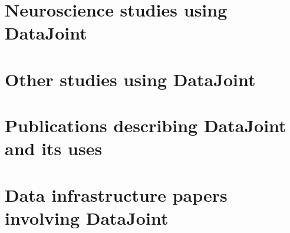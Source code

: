 \documentclass[letter,10pt]{article}
\begin{document}
\section*{Neuroscience studies using DataJoint}

\cite{vai-2013, cotton-2013, ecker-2014, reimer2014pupil, erisken-2014, 
froudarakis_population_2014, yatsenko2015a, jiang_principles_2015,
shan2016spatial, cadwell2016, baden2016functional,
reimer-2016, franke-2017, denfield2018attentional, 
sinz2018stimulus, roson2019mouse, walker2019inception, fahey2019global, cadena2019deep, heath2020circuit,
aguillon2020standardized, yap2020bidirectional}

\section*{Other studies using DataJoint}
\cite{hartmann2016alternative}

\section*{Publications describing DataJoint and its uses}
\cite{yatsenko-datajoint-2015, yatsenko-2018-datajoint, singer2019, reimer2020core}

\section*{Data infrastructure papers involving DataJoint}
\cite{bonacchi2019data}



\end{document}
